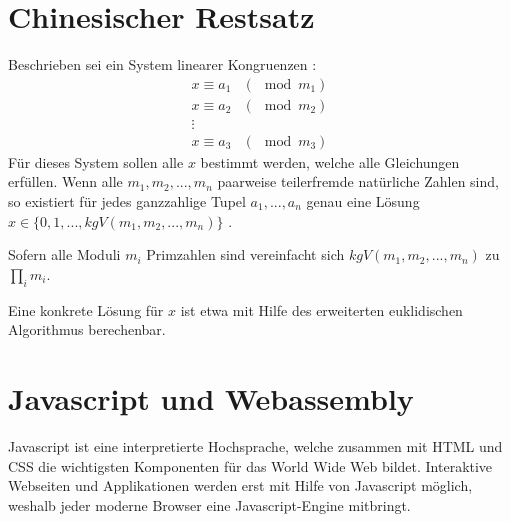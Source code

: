 







\section{Chinesischer Restsatz}
\label{chinese_remainder}

Beschrieben sei ein System linearer Kongruenzen \cite{CRTref}:
\begin{align*}
x \equiv a_1 &(\mod m_1)\\
x \equiv a_2 &(\mod m_2)\\
\vdots\\
x \equiv a_3 &(\mod m_3)
\end{align*}
Für dieses System sollen alle $x$ bestimmt werden, welche alle Gleichungen erfüllen.
Wenn alle $m_1,m_2,...,m_n$ paarweise teilerfremde natürliche Zahlen sind, so existiert für jedes ganzzahlige Tupel $a_1, ..., a_n$ genau eine Lösung $x \in \{0,1,...,kgV(m_1,m_2,...,m_n)\}$ \cite{CRTwiki}.

Sofern alle Moduli $m_i$ Primzahlen sind vereinfacht sich $kgV(m_1,m_2,...,m_n)$ zu $\prod_i m_i$.

Eine konkrete Lösung für $x$ ist etwa mit Hilfe des erweiterten euklidischen Algorithmus berechenbar.


\section{Javascript und Webassembly}

Javascript ist eine interpretierte Hochsprache, welche zusammen mit HTML und CSS die wichtigsten Komponenten für das World Wide Web bildet. 
Interaktive Webseiten und Applikationen werden erst mit Hilfe von Javascript möglich, weshalb jeder moderne Browser eine Javascript-Engine mitbringt.

